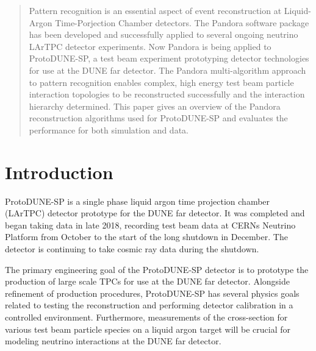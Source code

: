 
\date{Received: date / Accepted: date}

\maketitle

\begin{abstract}
Pattern recognition is an essential aspect of event reconstruction at Liquid-Argon Time-Porjection Chamber detectors.  The Pandora software package has been developed and successfully applied to several ongoing neutrino LArTPC detector experiments.  Now Pandora is being applied to ProtoDUNE-SP, a test beam experiment prototyping detector technologies for use at the DUNE far detector.  The Pandora multi-algorithm approach to pattern recognition enables complex, high energy test beam particle interaction topologies to be reconstructed successfully and the interaction hierarchy determined.  This paper gives an overview of the Pandora reconstruction algorithms used for ProtoDUNE-SP and evaluates the performance for both simulation and data.
\end{abstract}

\section{Introduction}
\label{sec:intro}
ProtoDUNE-SP is a single phase liquid argon time projection chamber (LArTPC) detector prototype for the DUNE far detector.  It was completed and began taking data in late 2018, recording test beam data at CERNs Neutrino Platform from October to the start of the long shutdown in December.  The detector is continuing to take cosmic ray data during the shutdown.  

The primary engineering goal of the ProtoDUNE-SP detector is to prototype the production of large scale TPCs for use at the DUNE far detector.  Alongside refinement of production procedures, ProtoDUNE-SP has several physics goals related to testing the reconstruction and performing detector calibration in a controlled environment.  Furthermore, measurements of the cross-section for various test beam particle species on a liquid argon target will be crucial for modeling neutrino interactions at the DUNE far detector.

